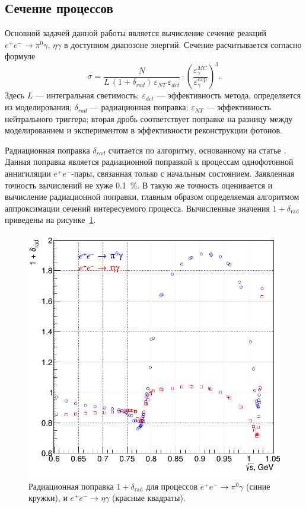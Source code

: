 \subsection{Сечение процессов}

Основной задачей данной работы является вычисление сечение реакций
$e^+e^- \to \pi^0 \gamma, \, \eta \gamma$ в доступном диапозоне энергий.
Сечение расчитывается согласно формуле
\begin{equation}
	\sigma = \frac{ N } { L \, (1+\delta_{rad}) \, \varepsilon_{NT} \,
	\varepsilon_{det}} \cdot  
	\left( \frac{ {\varepsilon^{MC}_{\gamma}} }{ {\varepsilon^{exp}_{\gamma}} } \right)^3.
\end{equation}
Здесь $L$ --- интегральная светимость;
$\varepsilon_{det}$ --- эффективность метода, определяется из моделирования;
$\delta_{rad}$ --- радиационная поправка;
$\varepsilon_{NT}$ --- эффективность нейтрального триггера;
вторая дробь соответствует поправке на разницу между моделированием и экспериментом в эффективности
реконструкции фотонов.

Радиационная поправка $\delta_{rad}$ считается по алгоритму, основанному на статье \cite{Kuraev1985}.
Данная поправка является радиационной поправкой к процессам однофотонной аннигиляции $e^+ e^-$-пары,
связанная только с начальным состоянием.
Заявленная точность вычислений не хуже \SI{0.1}{\percent}.
В такую же точность оценивается и вычисление радиационной поправки,
главным образом определяемая алгоритмом аппроксимации сечений интересуемого процесса.
Вычисленные значения $1+\delta_{\text{rad}}$ приведены на рисунке~\ref{fig:rad_corr}.

\begin{figure}[htbp]
	\centering
	\includegraphics[width=.5\textwidth]{img/rad_corr_for_pseudodisser.png}
	\caption{Радиационная поправка $1+\delta_{\text{rad}}$ для процессов
		$e^+ e^- \to \pi^0 \gamma$ (синие кружки),
		и $e^+ e^- \to \eta \gamma$ (красные квадраты).}\label{fig:rad_corr}
\end{figure}

